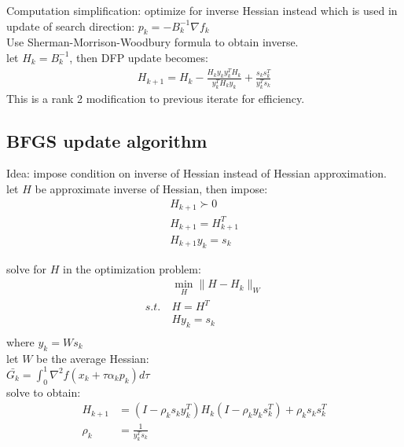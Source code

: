 \documentclass[8pt,letter]{article}
\begin{document}
\begin{multicols*}{2}
  Computation simplification: optimize for inverse Hessian instead  which is used in update of search direction: $p_k = - B_k^{-1} \nabla f_k$\\
  Use Sherman-Morrison-Woodbury formula to obtain inverse.\\
  let $H_k = B_k^{-1}$, then DFP update becomes:\\
  \begin{align*}
    H_{k+1} = H_k - \frac{H_k y_k y_k^T H_k}{y_k^T H_k y_k} + \frac{s_k s_k^T}{y_k^T s_k}
  \end{align*}
  This is a rank 2 modification to previous iterate for efficiency.
  
  \subsection{BFGS update algorithm}

  Idea: impose condition on inverse of Hessian instead of Hessian approximation.\\

  let $H$ be approximate inverse of Hessian, then impose:
  \begin{align*}
    H_{k+1} \succ 0\\
    H_{k+1} = H_{k+1}^T\\
    H_{k+1} y_k = s_k
  \end{align*}

  solve for $H$ in the optimization problem:
  \begin{align*}
    &\min_H \|H-H_k\|_W\\
    s.t.\ &H=H^T\\
    &H y_k = s_k\\
  \end{align*}
  where $y_k=W s_k$\\
  
  let $W$ be the average Hessian:\\
  $\bar{G_k}=\int_0^1 \nabla^2 f(x_k + \tau \alpha_k p_k) d \tau$\\

  solve to obtain:
  \begin{align*}
    H_{k+1} & = (I-\rho_k s_k y_k^T) H_k (I - \rho_k y_k s_k^T) + \rho_k s_k s_k^T\\
    \rho_k & = \frac{1}{y_k^T s_k}
  \end{align*}
  


\end{multicols*}
\end{document}
